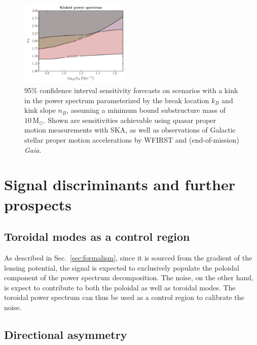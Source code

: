 \documentclass[twocolumn]{aastex63}
\newcommand{\Gaia}{\emph{Gaia}}
\begin{document}
\begin{figure}[!htbp]
  \centering
  \includegraphics[width=0.47\textwidth]{plots/kink_PS_sig}
  \caption{95\% confidence interval sensitivity forecasts on scenarios with a kink in the power spectrum parameterized by the break location $k_B$ and kink slope $n_B$, assuming a minimum bound substructure mass of $10\,\mathrm M_\odot$. Shown are sensitivities achievable using quasar proper motion measurements with SKA, as well as observations of Galactic stellar proper motion accelerations by WFIRST and (end-of-mission) \Gaia.}
  \label{fig:kink_ps}
\end{figure}

\section{Signal discriminants and further prospects}
\label{sec:handles}

\subsection{Toroidal modes as a control region}

As described in Sec.~\ref{sec:formalism}, since it is sourced from the gradient of the lensing potential, the signal is expected to exclusively populate the poloidal component of the power spectrum decomposition. The noise, on the other hand, is expect to contribute to both the poloidal as well as toroidal modes. The toroidal power spectrum can thus be used as a control region to calibrate the noise.

\subsection{Directional asymmetry}
\end{document}
